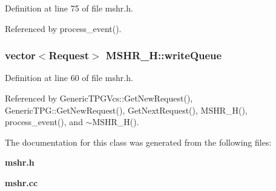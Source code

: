 Definition at line 75 of file mshr.h.

Referenced by process\_\-event().
\subsubsection[{writeQueue}]{\setlength{\rightskip}{0pt plus 5cm}vector$<${\bf Request}$>$ {\bf MSHR\_\-H::writeQueue}}\label{classMSHR__H_2a60616a96f5297469d64068a83de430}




Definition at line 60 of file mshr.h.

Referenced by GenericTPGVcs::GetNewRequest(), GenericTPG::GetNewRequest(), GetNextRequest(), MSHR\_\-H(), process\_\-event(), and $\sim$MSHR\_\-H().

The documentation for this class was generated from the following files:\begin{CompactItemize}
\item 
{\bf mshr.h}\item 
{\bf mshr.cc}\end{CompactItemize}
